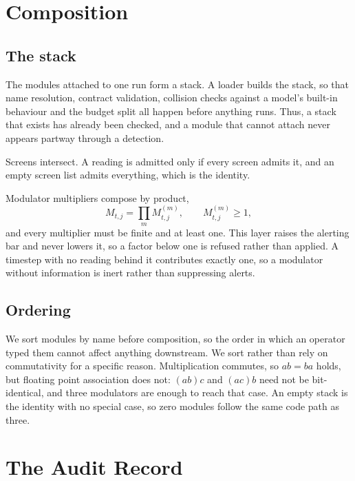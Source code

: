 \documentclass{article}
\begin{document}
\section{Composition}
\label{sec:composition}

\subsection{The stack}

The modules attached to one run form a stack. A loader builds the stack, so
that name resolution, contract validation, collision checks against a model's
built-in behaviour and the budget split all happen before anything runs. Thus,
a stack that exists has already been checked, and a module that cannot attach
never appears partway through a detection.

Screens intersect. A reading is admitted only if every screen admits it, and an
empty screen list admits everything, which is the identity.

Modulator multipliers compose by product,
\begin{equation}
  M_{t,j} = \prod_{m} M^{(m)}_{t,j},
  \qquad M^{(m)}_{t,j} \ge 1 ,
\end{equation}
and every multiplier must be finite and at least one. This layer raises the
alerting bar and never lowers it, so a factor below one is refused rather than
applied. A timestep with no reading behind it contributes exactly one, so a
modulator without information is inert rather than suppressing alerts.

\subsection{Ordering}

We sort modules by name before composition, so the order in which an operator
typed them cannot affect anything downstream. We sort rather than rely on
commutativity for a specific reason. Multiplication commutes, so $ab = ba$
holds, but floating point association does not: $(ab)c$ and $(ac)b$ need not
be bit-identical, and three modulators are enough to reach that case. An empty
stack is the identity with no special case, so zero modules follow the same
code path as three.

\section{The Audit Record}
\label{sec:record}
\end{document}
